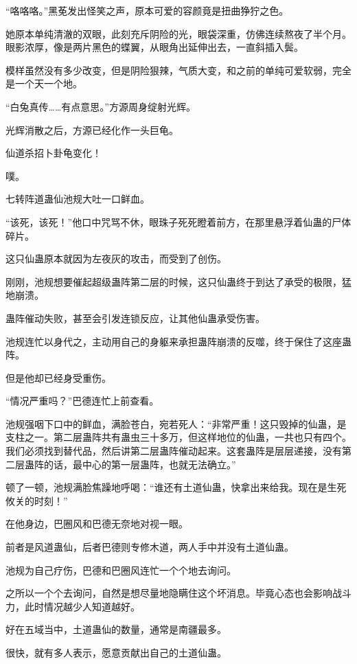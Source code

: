 
\begin{this_body}

“咯咯咯。”黑莬发出怪笑之声，原本可爱的容颜竟是扭曲狰狞之色。

她原本单纯清澈的双眼，此刻充斥阴险的光，眼袋深重，仿佛连续熬夜了半个月。眼影浓厚，像是两片黑色的蝶翼，从眼角出延伸出去，一直斜插入鬓。

模样虽然没有多少改变，但是阴险狠辣，气质大变，和之前的单纯可爱软弱，完全是一个天一个地。

“白兔真传……有点意思。”方源周身绽射光辉。

光辉消散之后，方源已经化作一头巨龟。

仙道杀招卜卦龟变化！

噗。

七转阵道蛊仙池规大吐一口鲜血。

“该死，该死！”他口中咒骂不休，眼珠子死死瞪着前方，在那里悬浮着仙蛊的尸体碎片。

这只仙蛊原本就因为左夜灰的攻击，而受到了创伤。

刚刚，池规想要催起超级蛊阵第二层的时候，这只仙蛊终于到达了承受的极限，猛地崩溃。

蛊阵催动失败，甚至会引发连锁反应，让其他仙蛊承受伤害。

池规连忙以身代之，主动用自己的身躯来承担蛊阵崩溃的反噬，终于保住了这座蛊阵。

但是他却已经身受重伤。

“情况严重吗？”巴德连忙上前查看。

池规强咽下口中的鲜血，满脸苍白，宛若死人：“非常严重！这只毁掉的仙蛊，是支柱之一。第二层蛊阵共有蛊虫三十多万，但这样地位的仙蛊，一共也只有四个。我们必须找到替代品，然后讲第二层蛊阵催动起来。这套蛊阵是层层递接，没有第二层蛊阵的话，最中心的第一层蛊阵，也就无法确立。”

顿了一顿，池规满脸焦躁地呼喝：“谁还有土道仙蛊，快拿出来给我。现在是生死攸关的时刻！”

在他身边，巴圈风和巴德无奈地对视一眼。

前者是风道蛊仙，后者巴德则专修木道，两人手中并没有土道仙蛊。

池规为自己疗伤，巴德和巴圈风连忙一个个地去询问。

之所以一个个去询问，自然是想尽量地隐瞒住这个坏消息。毕竟心态也会影响战斗力，此时情况越少人知道越好。

好在五域当中，土道蛊仙的数量，通常是南疆最多。

很快，就有多人表示，愿意贡献出自己的土道仙蛊。


\end{this_body}
